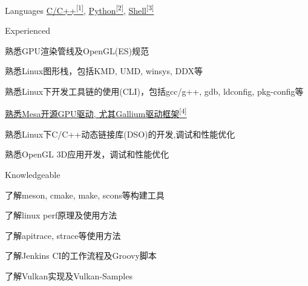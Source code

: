 
\begin{cvskills}
  \cvskill
    {Languages} %
    {\hyperlink{cpp-proj}{C/C++\textsuperscript{[1]}}, \hyperlink{python-proj}{Python\textsuperscript{[2]}}, \hyperlink{shell-proj}{Shell\textsuperscript{[3]}}} %
\end{cvskills}

\begin{cventries}
  \cventry
    {} %
    {Experienced} %
    {} %
    {} %
    {
      \begin{cvitems} %
        \item {熟悉GPU渲染管线及OpenGL(ES)规范}
        \item {熟悉Linux图形栈，包括KMD, UMD, winsys, DDX等}
        \item {熟悉Linux下开发工具链的使用(CLI)，包括gcc/g++, gdb, ldconfig, pkg-config等}
        \item {\hyperlink{mesa-mr}{熟悉Mesa开源GPU驱动, 尤其Gallium驱动框架\textsuperscript{[4]}}}
        \item {熟悉Linux下C/C++动态链接库(DSO)的开发,调试和性能优化}
        \item {熟悉OpenGL 3D应用开发，调试和性能优化}
      \end{cvitems}
    }
  \cventry
    {} %
    {Knowledgeable} %
    {} %
    {} %
    {
      \begin{cvitems} %
        \item {了解meson, cmake, make, scons等构建工具}
        \item {了解linux perf原理及使用方法}
        \item {了解apitrace, strace等使用方法}
        \item {了解Jenkins CI的工作流程及Groovy脚本}
        \item {了解Vulkan实现及Vulkan-Samples}
      \end{cvitems}
    }
\end{cventries}
